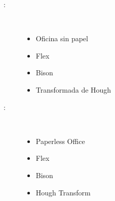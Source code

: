 \begin{multicols}{2}
\begin{description}
\item [\palabraschaveprincipal:] \mbox{} \\[-20pt]
  \begin{itemize}
      \item Oficina sin papel 
      \item Flex
      \item Bison
      \item Transformada de Hough
  \end{itemize}
\end{description}
\begin{description}
\item [\palabraschavesecundaria:] \mbox{} \\[-20pt]
  \begin{itemize}
      \item Paperless Office
      \item Flex
      \item Bison      
      \item Hough Transform
  \end{itemize}

\end{description}
\end{multicols}
